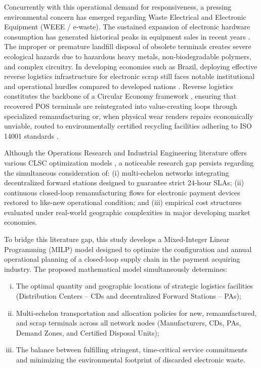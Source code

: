 \documentclass[preprint,12pt,authoryear]{elsarticle}
\begin{document}
Concurrently with this operational demand for responsiveness, a pressing environmental concern has emerged regarding Waste Electrical and Electronic Equipment (WEEE / e-waste). The sustained expansion of electronic hardware consumption has generated historical peaks in equipment sales in recent years \citep{Santos2014a}. The improper or premature landfill disposal of obsolete terminals creates severe ecological hazards due to hazardous heavy metals, non-biodegradable polymers, and complex circuitry. In developing economies such as Brazil, deploying effective reverse logistics infrastructure for electronic scrap still faces notable institutional and operational hurdles compared to developed nations \citep{demajorovic2016logistica}. Reverse logistics constitutes the backbone of a Circular Economy framework \citep{guarnieri2011logistica}, ensuring that recovered POS terminals are reintegrated into value-creating loops through specialized remanufacturing or, when physical wear renders repairs economically unviable, routed to environmentally certified recycling facilities adhering to ISO 14001 standards \citep{mogalelogirever}.

Although the Operations Research and Industrial Engineering literature offers various CLSC optimization models \citep{SINGH2018343,AMIN2017316}, a noticeable research gap persists regarding the simultaneous consideration of: (i) multi-echelon networks integrating decentralized forward stations designed to guarantee strict 24-hour SLAs; (ii) continuous closed-loop remanufacturing flows for electronic payment devices restored to like-new operational condition; and (iii) empirical cost structures evaluated under real-world geographic complexities in major developing market economies.

To bridge this literature gap, this study develops a Mixed-Integer Linear Programming (MILP) model designed to optimize the configuration and annual operational planning of a closed-loop supply chain in the payment acquiring industry. The proposed mathematical model simultaneously determines:
\begin{enumerate}[(i)]
    \item The optimal quantity and geographic locations of strategic logistics facilities (Distribution Centers -- CDs and decentralized Forward Stations -- PAs);
    \item Multi-echelon transportation and allocation policies for new, remanufactured, and scrap terminals across all network nodes (Manufacturers, CDs, PAs, Demand Zones, and Certified Disposal Units);
    \item The balance between fulfilling stringent, time-critical service commitments and minimizing the environmental footprint of discarded electronic waste.
\end{enumerate}
\end{document}
